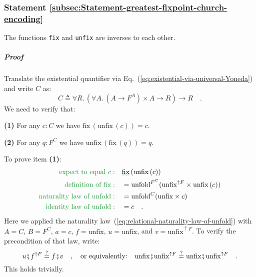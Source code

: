 \subsubsection{Statement \label{subsec:Statement-greatest-fixpoint-church-encoding}\ref{subsec:Statement-greatest-fixpoint-church-encoding}}

The functions \lstinline!fix! and \lstinline!unfix! are inverses
to each other.

\subparagraph{Proof}

Translate the existential quantifier via Eq.~(\ref{eq:existential-via-universal-Yoneda})
and write $C$ as:
\[
C\triangleq\forall R.\,(\forall A.\,(A\rightarrow F^{A})\times A\rightarrow R)\rightarrow R\quad.
\]
We need to verify that:

\textbf{(1)} For any $c:C$ we have $\text{fix}\,(\text{unfix}\,(c))=c$.

\textbf{(2)} For any $q:F^{C}$ we have $\text{unfix}\,(\text{fix}\,(q))=q$.

To prove item \textbf{(1)}: 
\begin{align*}
{\color{greenunder}\text{expect to equal }c:}\quad & \gunderline{\text{fix}}\,(\text{unfix}\,(c))\\
{\color{greenunder}\text{definition of }\text{fix}:}\quad & =\text{unfold}^{F^{C}}(\text{unfix}^{\uparrow F}\times\text{unfix}\,(c))\\
{\color{greenunder}\text{naturality law of }\text{unfold}:}\quad & =\text{unfold}^{C}(\text{unfix}\times c)\\
{\color{greenunder}\text{identity law of }\text{unfold}:}\quad & =c\quad.
\end{align*}
Here we applied the naturality law~(\ref{eq:relational-naturality-law-of-unfold})
with $A=C$, $B=F^{C}$, $a=c$, $f=\text{unfix}$, $u=\text{unfix}$,
and $v=\text{unfix}^{\uparrow F}$. To verify the precondition of
that law, write:
\[
u\bef f^{\uparrow F}\overset{?}{=}f\bef v\quad,\quad\text{or equivalently:}\quad\text{unfix}\bef\text{unfix}^{\uparrow F}\overset{?}{=}\text{unfix}\bef\text{unfix}^{\uparrow F}\quad.
\]
This holds trivially.

